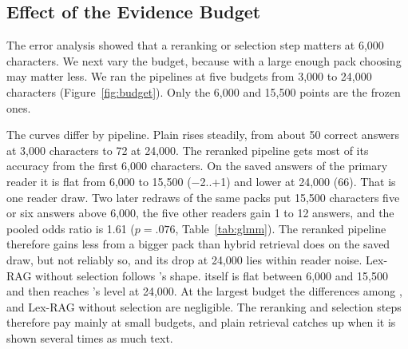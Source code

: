 \subsection{Effect of the Evidence Budget}
\label{sec:evidence}
\label{sec:budget}

The error analysis showed that a reranking or selection step matters at 6,000 characters. We next vary the budget, because with a large enough pack choosing may matter less. We ran the pipelines at five budgets from 3,000 to 24,000 characters (Figure~\ref{fig:budget}). Only the 6,000 and 15,500 points are the frozen ones.


The curves differ by pipeline. Plain \hybrid{} rises steadily, from about 50 correct answers at 3,000 characters to 72 at 24,000. The reranked pipeline \hr{} gets most of its accuracy from the first 6,000 characters. On the saved answers of the primary reader it is flat from 6,000 to 15,500 ($-$2..+1) and lower at 24,000 (66). That is one reader draw. Two later redraws of the same packs put 15,500 characters five or six answers above 6,000, the five other readers gain 1 to 12 answers, and the pooled odds ratio is 1.61 ($p=.076$, Table~\ref{tab:glmm}). The reranked pipeline therefore gains less from a bigger pack than hybrid retrieval does on the saved draw, but not reliably so, and its drop at 24,000 lies within reader noise. Lex-RAG without selection follows \hybrid's shape. \lexb{} itself is flat between 6,000 and 15,500 and then reaches \hybrid's level at 24,000. At the largest budget the differences among \hybrid, \lexb{} and Lex-RAG without selection are negligible. The reranking and selection steps therefore pay mainly at small budgets, and plain retrieval catches up when it is shown several times as much text.

